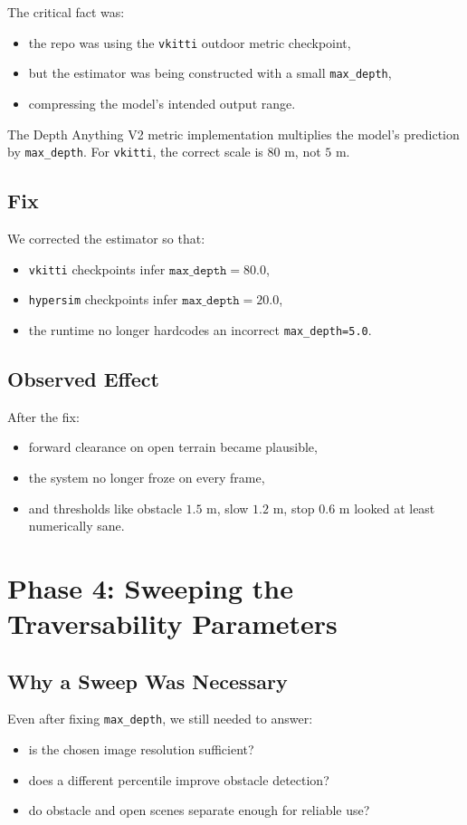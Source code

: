 \documentclass[11pt]{article}
\begin{document}
The critical fact was:
\begin{itemize}[leftmargin=*]
\item the repo was using the \texttt{vkitti} outdoor metric checkpoint,
\item but the estimator was being constructed with a small \texttt{max\_depth},
\item compressing the model's intended output range.
\end{itemize}

The Depth Anything V2 metric implementation multiplies the model's prediction by \texttt{max\_depth}. For \texttt{vkitti}, the correct scale is $80\text{ m}$, not $5\text{ m}$.

\subsection{Fix}
We corrected the estimator so that:
\begin{itemize}[leftmargin=*]
\item \texttt{vkitti} checkpoints infer $\texttt{max\_depth} = 80.0$,
\item \texttt{hypersim} checkpoints infer $\texttt{max\_depth} = 20.0$,
\item the runtime no longer hardcodes an incorrect \texttt{max\_depth=5.0}.
\end{itemize}

\subsection{Observed Effect}
After the fix:
\begin{itemize}[leftmargin=*]
\item forward clearance on open terrain became plausible,
\item the system no longer froze on every frame,
\item and thresholds like obstacle $1.5\text{ m}$, slow $1.2\text{ m}$, stop $0.6\text{ m}$ looked at least numerically sane.
\end{itemize}

\section{Phase 4: Sweeping the Traversability Parameters}
\subsection{Why a Sweep Was Necessary}
Even after fixing \texttt{max\_depth}, we still needed to answer:
\begin{itemize}[leftmargin=*]
\item is the chosen image resolution sufficient?
\item does a different percentile improve obstacle detection?
\item do obstacle and open scenes separate enough for reliable use?
\end{itemize}
\end{document}
